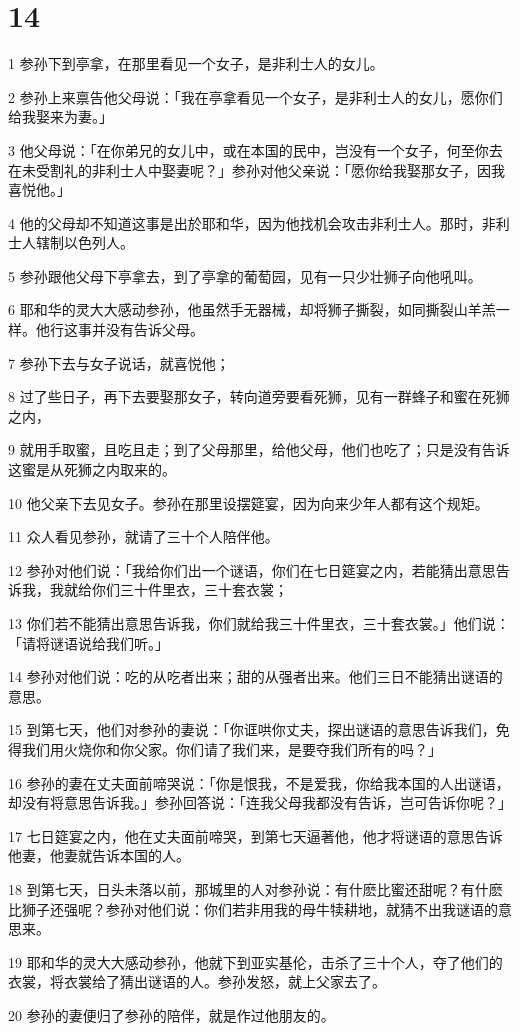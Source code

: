 \chapter{14}

\par 1 参孙下到亭拿，在那里看见一个女子，是非利士人的女儿。
\par 2 参孙上来禀告他父母说：「我在亭拿看见一个女子，是非利士人的女儿，愿你们给我娶来为妻。」
\par 3 他父母说：「在你弟兄的女儿中，或在本国的民中，岂没有一个女子，何至你去在未受割礼的非利士人中娶妻呢？」参孙对他父亲说：「愿你给我娶那女子，因我喜悦他。」
\par 4 他的父母却不知道这事是出於耶和华，因为他找机会攻击非利士人。那时，非利士人辖制以色列人。
\par 5 参孙跟他父母下亭拿去，到了亭拿的葡萄园，见有一只少壮狮子向他吼叫。
\par 6 耶和华的灵大大感动参孙，他虽然手无器械，却将狮子撕裂，如同撕裂山羊羔一样。他行这事并没有告诉父母。
\par 7 参孙下去与女子说话，就喜悦他；
\par 8 过了些日子，再下去要娶那女子，转向道旁要看死狮，见有一群蜂子和蜜在死狮之内，
\par 9 就用手取蜜，且吃且走；到了父母那里，给他父母，他们也吃了；只是没有告诉这蜜是从死狮之内取来的。
\par 10 他父亲下去见女子。参孙在那里设摆筵宴，因为向来少年人都有这个规矩。
\par 11 众人看见参孙，就请了三十个人陪伴他。
\par 12 参孙对他们说：「我给你们出一个谜语，你们在七日筵宴之内，若能猜出意思告诉我，我就给你们三十件里衣，三十套衣裳；
\par 13 你们若不能猜出意思告诉我，你们就给我三十件里衣，三十套衣裳。」他们说：「请将谜语说给我们听。」
\par 14 参孙对他们说：吃的从吃者出来；甜的从强者出来。他们三日不能猜出谜语的意思。
\par 15 到第七天，他们对参孙的妻说：「你诓哄你丈夫，探出谜语的意思告诉我们，免得我们用火烧你和你父家。你们请了我们来，是要夺我们所有的吗？」
\par 16 参孙的妻在丈夫面前啼哭说：「你是恨我，不是爱我，你给我本国的人出谜语，却没有将意思告诉我。」参孙回答说：「连我父母我都没有告诉，岂可告诉你呢？」
\par 17 七日筵宴之内，他在丈夫面前啼哭，到第七天逼著他，他才将谜语的意思告诉他妻，他妻就告诉本国的人。
\par 18 到第七天，日头未落以前，那城里的人对参孙说：有什麽比蜜还甜呢？有什麽比狮子还强呢？参孙对他们说：你们若非用我的母牛犊耕地，就猜不出我谜语的意思来。
\par 19 耶和华的灵大大感动参孙，他就下到亚实基伦，击杀了三十个人，夺了他们的衣裳，将衣裳给了猜出谜语的人。参孙发怒，就上父家去了。
\par 20 参孙的妻便归了参孙的陪伴，就是作过他朋友的。

